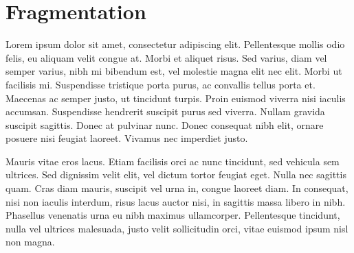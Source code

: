 

\section{Fragmentation}

Lorem ipsum dolor sit amet, consectetur adipiscing elit. Pellentesque mollis odio felis, eu aliquam velit congue at. Morbi et aliquet risus. Sed varius, diam vel semper varius, nibh mi bibendum est, vel molestie magna elit nec elit. Morbi ut facilisis mi. Suspendisse tristique porta purus, ac convallis tellus porta et. Maecenas ac semper justo, ut tincidunt turpis. Proin euismod viverra nisi iaculis accumsan. Suspendisse hendrerit suscipit purus sed viverra. Nullam gravida suscipit sagittis. Donec at pulvinar nunc. Donec consequat nibh elit, ornare posuere nisi feugiat laoreet. Vivamus nec imperdiet justo.

Mauris vitae eros lacus. Etiam facilisis orci ac nunc tincidunt, sed vehicula sem ultrices. Sed dignissim velit elit, vel dictum tortor feugiat eget. Nulla nec sagittis quam. Cras diam mauris, suscipit vel urna in, congue laoreet diam. In consequat, nisi non iaculis interdum, risus lacus auctor nisi, in sagittis massa libero in nibh. Phasellus venenatis urna eu nibh maximus ullamcorper. Pellentesque tincidunt, nulla vel ultrices malesuada, justo velit sollicitudin orci, vitae euismod ipsum nisl non magna.